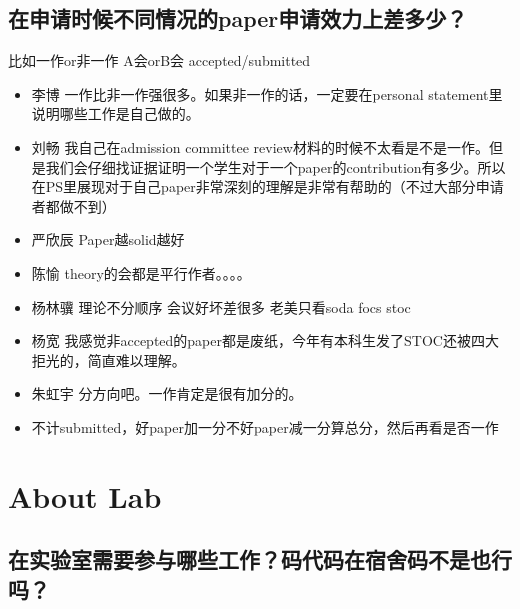 \documentclass{vivid_layout}
\begin{document}
\subsection{在申请时候不同情况的paper申请效力上差多少？}
比如一作or非一作 A会orB会 accepted/submitted
\begin{itemize}
\item  { 李博}  \quad 一作比非一作强很多。如果非一作的话，一定要在personal statement里说明哪些工作是自己做的。
\item  { 刘畅}  \quad 我自己在admission committee review材料的时候不太看是不是一作。但是我们会仔细找证据证明一个学生对于一个paper的contribution有多少。所以在PS里展现对于自己paper非常深刻的理解是非常有帮助的（不过大部分申请者都做不到）
\item  { 严欣辰}  \quad Paper越solid越好
\item  { 陈愉}  \quad theory的会都是平行作者。。。。
\item  { 杨林骥}  \quad 理论不分顺序 会议好坏差很多 老美只看soda focs stoc
\item  { 杨宽}  \quad 我感觉非accepted的paper都是废纸，今年有本科生发了STOC还被四大拒光的，简直难以理解。
\item  { 朱虹宇}  \quad 分方向吧。一作肯定是很有加分的。
\item 不计submitted，好paper加一分不好paper减一分算总分，然后再看是否一作
\end{itemize}

\section{About Lab}
\addtocounter{section}{1}
\setcounter{subsection}{0}
\subsection{在实验室需要参与哪些工作？码代码在宿舍码不是也行吗？}
\end{document}

